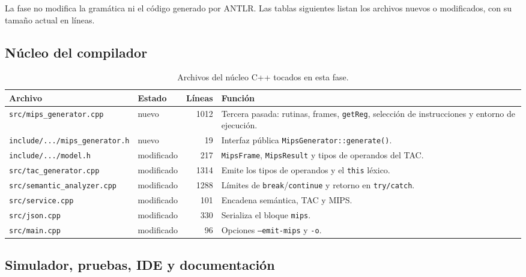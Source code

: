 \documentclass[11pt,a4paper]{article}
\begin{document}
La fase no modifica la gramática ni el código generado por ANTLR. Las tablas
siguientes listan los archivos nuevos o modificados, con su tamaño actual en
líneas.

\subsection{Núcleo del compilador}

\begin{table}[H]
\centering
\small
\begin{tabular}{@{}L{5.9cm}L{1.9cm}rL{4.5cm}@{}}
\toprule
\textbf{Archivo} & \textbf{Estado} & \textbf{Líneas} & \textbf{Función} \\
\midrule
\texttt{src/mips\_generator.cpp} & nuevo & 1012 &
Tercera pasada: rutinas, frames, \texttt{getReg}, selección de instrucciones y
entorno de ejecución. \\
\texttt{include/.../mips\_generator.h} & nuevo & 19 &
Interfaz pública \texttt{MipsGenerator::\allowbreak generate()}. \\
\texttt{include/.../model.h} & modificado & 217 &
\texttt{MipsFrame}, \texttt{MipsResult} y tipos de operandos del TAC. \\
\texttt{src/tac\_generator.cpp} & modificado & 1314 &
Emite los tipos de operandos y el \texttt{this} léxico. \\
\texttt{src/semantic\_analyzer.cpp} & modificado & 1288 &
Límites de \texttt{break}/\texttt{continue} y retorno en \texttt{try/catch}. \\
\texttt{src/service.cpp} & modificado & 101 &
Encadena semántica, TAC y MIPS. \\
\texttt{src/json.cpp} & modificado & 330 &
Serializa el bloque \texttt{mips}. \\
\texttt{src/main.cpp} & modificado & 96 &
Opciones \texttt{--emit-mips} y \texttt{-o}. \\
\bottomrule
\end{tabular}
\caption{Archivos del núcleo C++ tocados en esta fase.}
\end{table}

\subsection{Simulador, pruebas, IDE y documentación}
\end{document}
